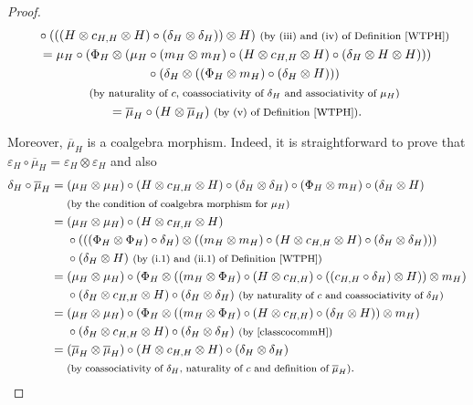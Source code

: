 \documentclass[pdftex]{sigma}
\numberwithin{equation}{section}
\begin{document}
\begin{proof}
\begin{gather*}
\quad{} \circ ( ( (H\otimes c_{H,H}\otimes H )\circ (\delta_{H}\otimes\delta_{H} ) )\otimes H )\ \text{\footnotesize\textnormal{(by (iii) and (iv) of Definition \ref{WTPH})}}\\
= \mu_{H}\circ (\Phi_{H}\otimes (\mu_{H}\circ (m_{H}\otimes m_{H} )\circ (H\otimes c_{H,H}\otimes H )\circ (\delta_{H}\otimes H\otimes H ) ) )\\
\quad{} \circ (\delta_{H}\otimes ( (\Phi_{H}\otimes m_{H} )\circ (\delta_{H}\otimes H ) ) )\\
\quad{}\, \text{\footnotesize\textnormal{(by naturality of $c$, coassociativity of $\delta_{H}$ and associativity of $\mu_{H}$)}}\\
= \overline{\mu}_{H}\circ (H\otimes\overline{\mu}_{H} )\ \text{\footnotesize\textnormal{(by (v) of Definition \ref{WTPH})}}.
\end{gather*}

Moreover, $\overline{\mu}_{H}$ is a coalgebra morphism. Indeed, it is straightforward to prove that $\varepsilon_{H}\circ \overline{\mu}_{H}=\varepsilon_{H}\otimes\varepsilon_{H}$ and also
\begin{align*}
 \delta_{H}\circ\overline{\mu}_{H}={}& (\mu_{H}\otimes\mu_{H})\circ(H\otimes c_{H,H}\otimes H)\circ(\delta_{H}\otimes\delta_{H})\circ(\Phi_{H}\otimes m_{H})\circ(\delta_{H}\otimes H)\\
 &{}\text{\footnotesize\textnormal{(by the condition of coalgebra morphism for $\mu_{H}$)}}\\
 ={}& (\mu_{H}\otimes\mu_{H})\circ(H\otimes c_{H,H}\otimes H)\\
 &{}\circ(((\Phi_{H}\otimes\Phi_{H})\circ\delta_{H})\otimes((m_{H}\otimes m_{H})\circ(H\otimes c_{H,H}\otimes H)\circ(\delta_{H}\otimes\delta_{H})))\\
 &{}\circ(\delta_{H}\otimes H) \ \text{\footnotesize\textnormal{(by (i.1) and (ii.1) of Definition \ref{WTPH})}}\\
 ={}& (\mu_{H}\otimes\mu_{H})\circ(\Phi_{H}\otimes((m_{H}\otimes \Phi_{H})\circ(H\otimes c_{H,H})\circ((c_{H,H}\circ\delta_{H})\otimes H))\otimes m_{H})\\
 &{}\circ(\delta_{H}\otimes c_{H,H}\otimes H)\circ(\delta_{H}\otimes\delta_{H})\ \text{\footnotesize\textnormal{(by naturality of $c$ and coassociativity of $\delta_{H}$)}}\\
 ={}& (\mu_{H}\otimes\mu_{H})\circ(\Phi_{H}\otimes((m_{H}\otimes \Phi_{H})\circ(H\otimes c_{H,H})\circ(\delta_{H}\otimes H))\otimes m_{H})\\
 &{}\circ(\delta_{H}\otimes c_{H,H}\otimes H)\circ(\delta_{H}\otimes\delta_{H})\ \text{\footnotesize\textnormal{(by \eqref{classcocommH})}}\\
 ={}& (\overline{\mu}_{H}\otimes\overline{\mu}_{H})\circ(H\otimes c_{H,H}\otimes H)\circ(\delta_{H}\otimes\delta_{H})\\
 &{}\text{\footnotesize\textnormal{(by coassociativity of $\delta_{H}$, naturality of $c$ and definition of $\overline{\mu}_{H}$)}}.
\end{align*}


\end{proof}
\end{document}
